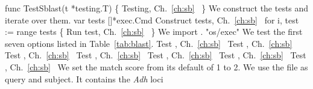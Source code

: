 func TestSblast(t *testing.T) \{
          \LA{}Testing, Ch.~\ref{ch:sb}~{\nwtagstyle{}}\RA{}
\}
\nwendcode{}\nwdocspar
We construct the tests and iterate over them.
\nwenddocs{}\endmoddef\nwstartdeflinemarkup{}\nwenddeflinemarkup
var tests []*exec.Cmd
\LA{}Construct tests, Ch.~\ref{ch:sb}~{\nwtagstyle{}}\RA{}
for i, test := range tests \{
          \LA{}Run test, Ch.~\ref{ch:sb}~{\nwtagstyle{}}\RA{}
\}
\nwendcode{}\nwdocspar
We import .
\nwenddocs{}\endmoddef\nwstartdeflinemarkup{}\nwenddeflinemarkup
"os/exec"
\nwendcode{}\nwdocspar
We test the first seven options listed in Table~\ref{tab:blast}.
\nwenddocs{}\endmoddef\nwstartdeflinemarkup{}\nwenddeflinemarkup
\LA{}Test , Ch.~\ref{ch:sb}~{\nwtagstyle{}}\RA{}
\LA{}Test , Ch.~\ref{ch:sb}~{\nwtagstyle{}}\RA{}
\LA{}Test , Ch.~\ref{ch:sb}~{\nwtagstyle{}}\RA{}
\LA{}Test , Ch.~\ref{ch:sb}~{\nwtagstyle{}}\RA{}
\LA{}Test , Ch.~\ref{ch:sb}~{\nwtagstyle{}}\RA{}
\LA{}Test , Ch.~\ref{ch:sb}~{\nwtagstyle{}}\RA{}
\LA{}Test , Ch.~\ref{ch:sb}~{\nwtagstyle{}}\RA{}
\nwendcode{}\nwdocspar
We set the match score from its default of 1 to 2. We use the file
 as query and subject. It contains the \emph{Adh} loci
